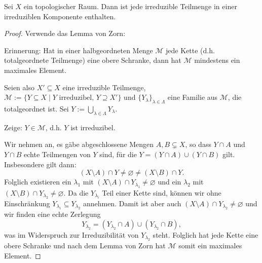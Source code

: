 \documentclass[a4paper,12pt]{scrbook}
\theoremstyle{keinenummern} %
\theoremstyle{mitnummern}
\theoremstyle{unserbeweis}
\newtheorem{proof}{Beweis}
\def\M{\mathcal{M}}
\newcommand{\leer}{\ensuremath{\varnothing}}
\begin{document}
\begin{prop}\label{1.2.10} Sei $X$ ein topologischer Raum. Dann ist jede irreduzible Teilmenge in einer irreduziblen Komponente enthalten.\end{prop}
\begin{proof} Verwende das Lemma von Zorn:

{\sc Erinnerung:} Hat in einer halbgeordneten Menge $\M$ jede Kette (d.h. totalgeordnete Teilmenge) eine obere Schranke, dann hat $\M$ mindestens ein maximales Element.

Seien also $X'\subseteq X$ eine irreduzible Teilmenge, $\M:=\{Y\subseteq X\mid Y\text{ irreduzibel, }Y\supseteq X'\}$ und $\{Y_{\lambda}\}_{\lambda\in\Lambda}$ eine Familie aus $\M$, die totalgeordnet ist. Sei $\displaystyle Y:=\bigcup_{\lambda\in\Lambda}Y_{\lambda}$.

{\sc Zeige:} $Y\in\M$, d.h. $Y$ ist irreduzibel.

Wir nehmen an, es gäbe abgeschlossene Mengen $A,B\subsetneq X$, so dass $Y\cap A$ und $Y\cap B$ echte Teilmengen von $Y$ sind, für die $Y=(Y\cap A)\cup(Y\cap B)$ gilt. Insbesondere gilt dann:
\[(X\setminus A)\cap Y\neq\leer\neq (X\setminus B)\cap Y.\]
Folglich existieren ein $\lambda_{1}$ mit $(X\setminus A)\cap Y_{\lambda_{1}}\neq\leer$ und ein $\lambda_{2}$ mit $(X\setminus B)\cap Y_{\lambda_{2}}\neq\leer$. Da die $Y_{\lambda_{i}}$ Teil einer Kette sind, können wir ohne Einschränkung $Y_{\lambda_{1}}\subseteq Y_{\lambda_{2}}$ annehmen. Damit ist aber auch $(X\setminus A)\cap Y_{\lambda_{2}}\neq\leer$ und wir finden eine echte Zerlegung
\[Y_{\lambda_{2}}=(Y_{\lambda_{2}}\cap A)\cup(Y_{\lambda_{2}}\cap B),\]
was im Widerspruch zur Irreduzibilität von $Y_{\lambda_{2}}$ steht. Folglich hat jede Kette eine obere Schranke und nach dem Lemma von Zorn hat $\M$ somit ein maximales Element.
\end{proof}
\end{document}
